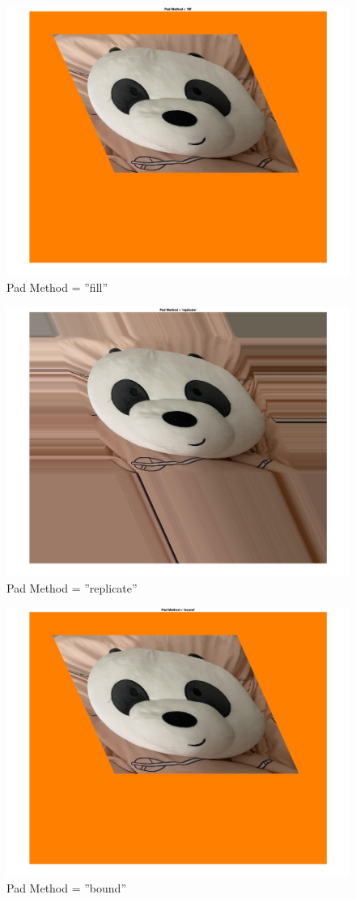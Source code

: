 \documentclass[conference]{IEEEtran}
\begin{document}
\begin{figure}[h!]
\centering
\includegraphics[width=0.7\linewidth]{images/img31.jpg}
\caption{Pad Method = ''fill''}
\label{fig:fill}
\end{figure}

\begin{figure}[h!]
\centering
\includegraphics[width=0.7\linewidth]{images/img32.jpg}
\caption{Pad Method = ''replicate''}
\label{fig:replicate}
\end{figure}

\begin{figure}[h!]
\centering
\includegraphics[width=0.7\linewidth]{images/img33.jpg}
\caption{Pad Method = ''bound''}
\label{fig:bound}
\end{figure}
\end{document}
